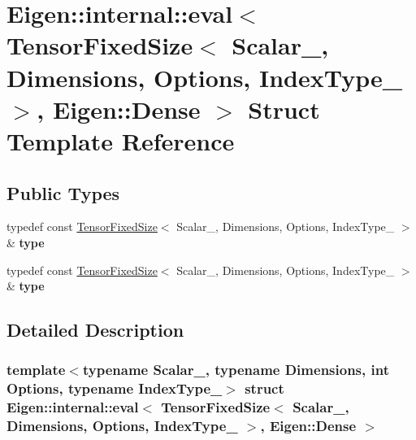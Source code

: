 \hypertarget{struct_eigen_1_1internal_1_1eval_3_01_tensor_fixed_size_3_01_scalar___00_01_dimensions_00_01_opt4684245dd379548d9718102e7d8e2d48}{}\section{Eigen\+:\+:internal\+:\+:eval$<$ Tensor\+Fixed\+Size$<$ Scalar\+\_\+, Dimensions, Options, Index\+Type\+\_\+ $>$, Eigen\+:\+:Dense $>$ Struct Template Reference}
\label{struct_eigen_1_1internal_1_1eval_3_01_tensor_fixed_size_3_01_scalar___00_01_dimensions_00_01_opt4684245dd379548d9718102e7d8e2d48}
\subsection*{Public Types}
\begin{DoxyCompactItemize}
\item 
\mbox{\label{struct_eigen_1_1internal_1_1eval_3_01_tensor_fixed_size_3_01_scalar___00_01_dimensions_00_01_opt4684245dd379548d9718102e7d8e2d48_a30316958c001f70a3f24b523176930c7}} 
typedef const \hyperlink{class_eigen_1_1_tensor_fixed_size}{Tensor\+Fixed\+Size}$<$ Scalar\+\_\+, Dimensions, Options, Index\+Type\+\_\+ $>$ \& {\bfseries type}
\item 
\mbox{\label{struct_eigen_1_1internal_1_1eval_3_01_tensor_fixed_size_3_01_scalar___00_01_dimensions_00_01_opt4684245dd379548d9718102e7d8e2d48_a30316958c001f70a3f24b523176930c7}} 
typedef const \hyperlink{class_eigen_1_1_tensor_fixed_size}{Tensor\+Fixed\+Size}$<$ Scalar\+\_\+, Dimensions, Options, Index\+Type\+\_\+ $>$ \& {\bfseries type}
\end{DoxyCompactItemize}


\subsection{Detailed Description}
\subsubsection*{template$<$typename Scalar\+\_\+, typename Dimensions, int Options, typename Index\+Type\+\_\+$>$\newline
struct Eigen\+::internal\+::eval$<$ Tensor\+Fixed\+Size$<$ Scalar\+\_\+, Dimensions, Options, Index\+Type\+\_\+ $>$, Eigen\+::\+Dense $>$}



